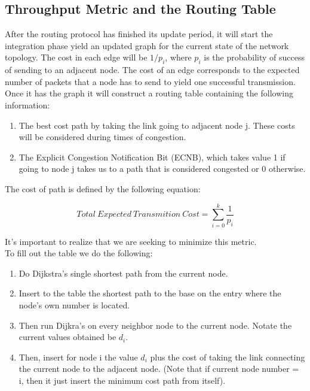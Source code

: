 \documentclass[letterpaper]{article}
\begin{document}
\subsection{Throughput Metric and the Routing Table}

After the routing protocol has finished its update period, it will start the integration phase yield an updated graph for the current state of the network topology. The cost in each edge will be $1/p_{i}$, where $p_{i}$ is the probability of success of sending to an adjacent node. The cost of an edge corresponds to the expected number of packets that a node has to send to yield one successful transmission. Once it has the graph it will construct a routing table containing the following information:

\begin{enumerate}
  \item The best cost path by taking the link going to adjacent node j. These costs will be considered during times of congestion.
  \item The Explicit Congestion Notification Bit (ECNB), which takes value 1 if going to node j takes us to a path that is considered congested or 0 otherwise.
\end{enumerate}

The cost of path is defined by the following equation:

$$  Total \ Expected \ Transmition \ Cost = \sum_{i=0}^{k}\frac{1}{p_{i}}$$

It's important to realize that we are seeking to minimize this metric.
\\

To fill out the table we do the following:

\begin{enumerate}
  \item Do Dijkstra's single shortest path from the current node.  
  \item Insert to the table the shortest path to the base on the entry where the node's own number is located.
  \item Then run Dijkra's on every neighbor node to the current node. Notate the current values obtained be $d_{i}$.
  \item Then, insert for node i the value $d_{i}$ plus the cost of taking the link connecting the current node to the adjacent node. (Note that if current node number = i, then it just insert the minimum cost path from itself).
\end{enumerate}
\end{document}
